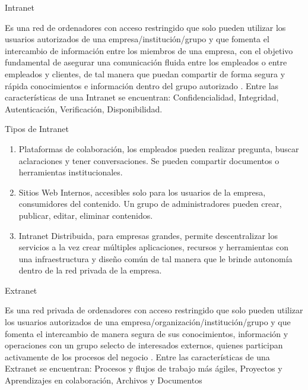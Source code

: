 \documentclass[a4paper,12pt]{article}
\begin{document}
\break
\begin{bf}
Intranet\\ 
\end{bf}
\break
Es una red de ordenadores con acceso restringido que solo pueden utilizar los 
usuarios autorizados de una empresa/institución/grupo y que fomenta el intercambio
de información entre los miembros de una empresa, con el objetivo fundamental de 
asegurar una comunicación fluida entre los empleados o entre empleados y clientes, 
de tal manera que puedan compartir de forma segura y rápida conocimientos e 
información dentro del grupo autorizado \cite{Cabello2014}.
Entre las características de una Intranet se encuentran: Confidencialidad, 
Integridad, Autenticación, Verificación, Disponibilidad.\\
\break 
\begin{bf}
Tipos de Intranet\\
\end{bf}
\begin{enumerate} 
\item Plataformas de colaboración, los empleados pueden realizar pregunta, buscar 
aclaraciones y tener conversaciones. Se pueden compartir documentos o herramientas 
institucionales.\\
\item Sitios Web Internos, accesibles solo para los usuarios de la empresa, consumidores
del contenido. Un grupo de administradores pueden crear, publicar, editar, 
eliminar contenidos.\\ 
\item Intranet Distribuida, para empresas grandes, permite descentralizar los servicios 
a la vez crear múltiples aplicaciones, recursos y herramientas con una 
infraestructura y diseño común de tal manera que le brinde autonomía dentro de la 
red privada de la empresa.\\
\end{enumerate}
\break 
\begin{bf}
Extranet\\
\end{bf}
\break
Es una red privada de ordenadores con acceso restringido que solo pueden utilizar 
los usuarios autorizados de una empresa/organización/institución/grupo y que 
fomenta el intercambio de manera segura de sus conocimientos, información y 
operaciones con un grupo selecto de interesados externos, quienes participan 
activamente de los procesos del negocio \cite{Cabello2014}. 
Entre las características de una Extranet se encuentran: Procesos y flujos de 
trabajo más ágiles, Proyectos y Aprendizajes en colaboración, Archivos y Documentos 
\end{document}
